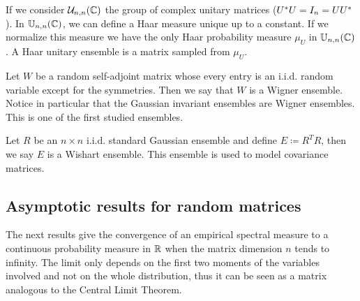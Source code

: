 \begin{example}
    If we consider $\mathcal U_{n,n}(\mathbb C)$ the group of complex unitary matrices ($U^*U = I_n = UU^*$). In $\mathbb U_{n,n}(\mathbb C)$, we can define  a Haar measure unique up to a constant. If we normalize this measure we have the only Haar probability measure $\mu_U$ in $\mathbb U_{n,n}(\mathbb C)$. A Haar unitary ensemble is a matrix sampled from $\mu_U$.
\end{example}

\begin{example}
    Let $W$ be a random self-adjoint matrix whose every entry is an i.i.d. random variable except for the symmetries. Then we say that $W$ is a Wigner ensemble. Notice in particular that the Gaussian invariant ensembles are Wigner ensembles. This is one of the first studied ensembles.
\end{example}

\begin{example}
    Let $R$ be an $n\times n$ i.i.d. standard Gaussian ensemble and define $E \coloneqq R^T R$, then we say $E$ is a Wishart ensemble. This ensemble is used to model covariance matrices. 
\end{example}

\subsection{Asymptotic results for random matrices}


The next results give the convergence of an empirical spectral measure to a continuous probability measure in $\mathbb R$ when the matrix dimension $n$ tends to infinity. The limit only depends on the first two moments of the variables involved and not on the whole distribution, thus it can be seen as a matrix analogous to the Central Limit Theorem.

